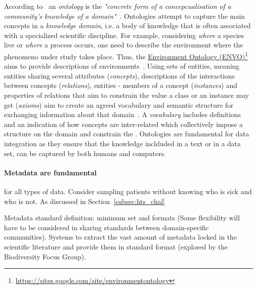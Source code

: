       According to~\citeauthor{stevens2000ontology} an \textit{ontology} is the \textit{"concrete form of a concepcualisation
      of a community's knowledge of a domain"}~\cite{stevens2000ontology}.
      Ontologies attempt to capture the main concepts in a \textit{knowledge domain}, 
      i.e. a body of knowledge that is often associated with a
      specialized scientific discipline. 
      For example, considering \textit{where} a species live or \textit{where} a process occurs, one need to describe the environment where the phenomeno under study 
      takes place. 
      Thus, the \href{https://sites.google.com/site/environmentontology}{Environment Ontology (ENVO)}\footnote{\href{https://sites.google.com/site/environmentontology}{https://sites.google.com/site/environmentontology}} aims to provide descriptions of environments~\cite{buttigieg2016environment}.
      Using sets of entities, meaning entities sharing several attributes (\textit{concepts}), 
      descriptions of the interactions between concepts (\textit{relations}), 
      entities - members of a concept (\textit{instances}) and 
      properties of relations that aim to constrain the value a class or an instance may get (\textit{axioms}) aim to create an agreed vocabulary and
      semantic structure for exchanging
      information about that domain~\cite{stevens2000ontology}. 
      A \textit{vocabulary} includes definitions and an indication of how concepts are inter-related which collectively impose a structure on the domain and constrain the
      \cite{uschold1998enterprise}.
      Ontologies are fundamental for data integration as they ensure that the knowledge
      inclduded in a text or in a data set, can be captured by both humans and computers. 


      \paragraph{Metadata are fundamental} for all types of data. 
      Consider sampling patients without knowing who is sick and who is not. 
      As discussed in Section~\ref{subsec:hts_chal}


      Metadata standard definition: minimum set and formats (Some flexibility will have to be considered in sharing standards between domain-specific communities).
      Systems to extract the vast amount of metadata locked in the scientific literature and provide them in standard format (explored by the Biodiversity Focus Group).






